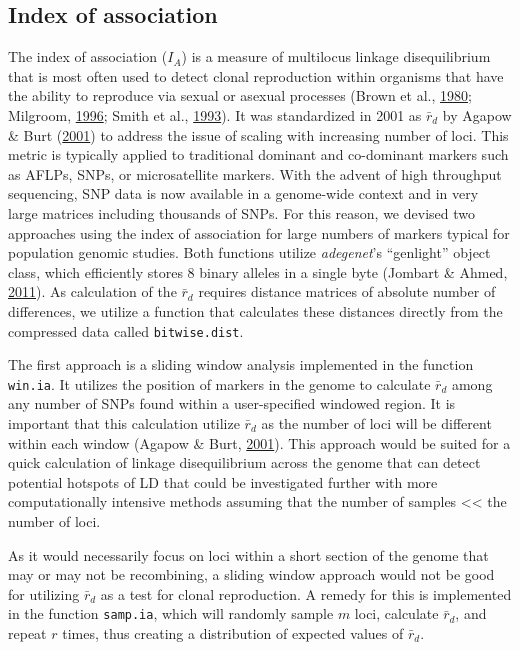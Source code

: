 \documentclass[double,11pt]{beavtex}
\begin{document}
  \subsection{Index of association}\label{index-of-association}
  
  The index of association (\(I_A\)) is a measure of multilocus linkage
  disequilibrium that is most often used to detect clonal reproduction
  within organisms that have the ability to reproduce via sexual or
  asexual processes (Brown et al.,
  \protect\hyperlink{ref-brown1980multilocus}{1980}; Milgroom,
  \protect\hyperlink{ref-milgroom1996recombination}{1996}; Smith et al.,
  \protect\hyperlink{ref-smith1993how}{1993}). It was standardized in 2001
  as \(\bar{r}_d\) by Agapow \& Burt
  (\protect\hyperlink{ref-Agapow_2001}{2001}) to address the issue of
  scaling with increasing number of loci. This metric is typically applied
  to traditional dominant and co-dominant markers such as AFLPs, SNPs, or
  microsatellite markers. With the advent of high throughput sequencing,
  SNP data is now available in a genome-wide context and in very large
  matrices including thousands of SNPs. For this reason, we devised two
  approaches using the index of association for large numbers of markers
  typical for population genomic studies. Both functions utilize
  \emph{adegenet}'s ``genlight'' object class, which efficiently stores 8
  binary alleles in a single byte (Jombart \& Ahmed,
  \protect\hyperlink{ref-jombart2011adegenet}{2011}). As calculation of
  the \(\bar{r}_d\) requires distance matrices of absolute number of
  differences, we utilize a function that calculates these distances
  directly from the compressed data called \texttt{bitwise.dist}.
  
  The first approach is a sliding window analysis implemented in the
  function \texttt{win.ia}. It utilizes the position of markers in the
  genome to calculate \(\bar{r}_d\) among any number of SNPs found within
  a user-specified windowed region. It is important that this calculation
  utilize \(\bar{r}_d\) as the number of loci will be different within
  each window (Agapow \& Burt, \protect\hyperlink{ref-Agapow_2001}{2001}).
  This approach would be suited for a quick calculation of linkage
  disequilibrium across the genome that can detect potential hotspots of
  LD that could be investigated further with more computationally
  intensive methods assuming that the number of samples
  \textless{}\textless{} the number of loci.
  
  As it would necessarily focus on loci within a short section of the
  genome that may or may not be recombining, a sliding window approach
  would not be good for utilizing \(\bar{r}_d\) as a test for clonal
  reproduction. A remedy for this is implemented in the function
  \texttt{samp.ia}, which will randomly sample \(m\) loci, calculate
  \(\bar{r}_d\), and repeat \(r\) times, thus creating a distribution of
  expected values of \(\bar{r}_d\).
  
\end{document}
